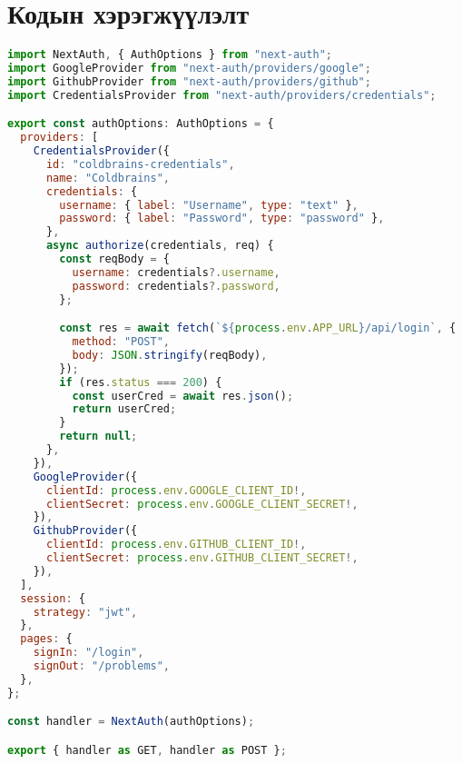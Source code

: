 \chapter{Кодын хэрэгжүүлэлт}


\begin{lstlisting}[language=JavaScript, frame=single, caption={Next.js Auth ашигласан байдал}]
import NextAuth, { AuthOptions } from "next-auth";
import GoogleProvider from "next-auth/providers/google";
import GithubProvider from "next-auth/providers/github";
import CredentialsProvider from "next-auth/providers/credentials";

export const authOptions: AuthOptions = {
  providers: [
    CredentialsProvider({
      id: "coldbrains-credentials",
      name: "Coldbrains",
      credentials: {
        username: { label: "Username", type: "text" },
        password: { label: "Password", type: "password" },
      },
      async authorize(credentials, req) {
        const reqBody = {
          username: credentials?.username,
          password: credentials?.password,
        };

        const res = await fetch(`${process.env.APP_URL}/api/login`, {
          method: "POST",
          body: JSON.stringify(reqBody),
        });
        if (res.status === 200) {
          const userCred = await res.json();
          return userCred;
        }
        return null;
      },
    }),
    GoogleProvider({
      clientId: process.env.GOOGLE_CLIENT_ID!,
      clientSecret: process.env.GOOGLE_CLIENT_SECRET!,
    }),
    GithubProvider({
      clientId: process.env.GITHUB_CLIENT_ID!,
      clientSecret: process.env.GITHUB_CLIENT_SECRET!,
    }),
  ],
  session: {
    strategy: "jwt",
  },
  pages: {
    signIn: "/login",
    signOut: "/problems",
  },
};

const handler = NextAuth(authOptions);

export { handler as GET, handler as POST };

\end{lstlisting}


